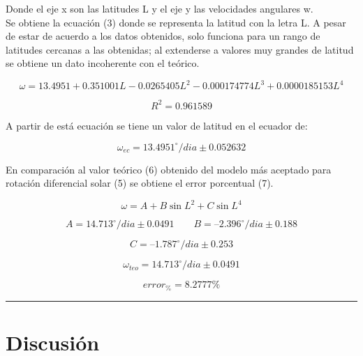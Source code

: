 \documentclass[11pt,letterpaper]{article}
\begin{document}
Donde el eje x son las latitudes L y el eje y las velocidades angulares w.
\\
 
Se obtiene la ecuación (3) donde se representa la latitud con la letra L. A pesar de estar de acuerdo a los datos obtenidos, solo funciona para un rango de latitudes cercanas a las obtenidas; al extenderse a valores muy grandes de latitud se obtiene un dato incoherente con el teórico. 

\begin{equation}
\omega =  13.4951 + 0.351001 L - 0.0265405 L^2 - 0.000174774 L^3 + 0.0000185153 L^4
\end{equation}

\begin{equation*}
R^2 =  0.961589
\end{equation*}

A partir de está ecuación se tiene un valor de latitud en el ecuador de:

\begin{equation}
\omega_{ec} =  13.4951^{\circ}\mathrm{}/dia \pm 0.052632
\end{equation}
 
En comparación al valor teórico (6) obtenido del modelo más aceptado para rotación diferencial solar (5) se obtiene el error porcentual (7).

\begin{equation}
\omega =  A + B \sin{L}^2 + C \sin{L}^4
\end{equation}

\begin{equation*}
A= 14.713^{\circ}\mathrm{}/dia \pm 0.0491
\quad
\quad
B= –2.396^{\circ}\mathrm{}/dia \pm 0.188
\end{equation*}

\begin{equation*}
C= –1.787^{\circ}\mathrm{}/dia \pm 0.253
\end{equation*}

\begin{equation}
\omega_{teo} =  14.713^{\circ}\mathrm{}/dia \pm 0.0491
\end{equation}

\begin{equation}
error_{\%} =  8.2777 \%
\end{equation}

\hrule

\section{Discusión}
\end{document}
